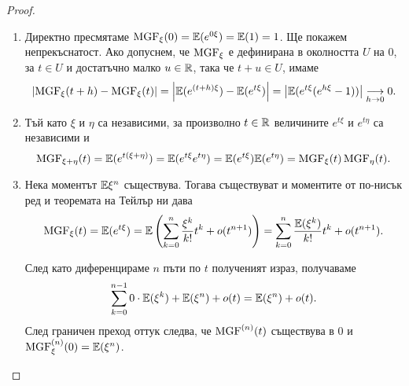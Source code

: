 \documentclass[numbers=endperiod, DIV=15, bibliography=totocnumbered]{scrartcl}
\begin{document}
\begin{proof}
  \mbox{}
  \begin{enumerate}
    \item Директно пресмятаме $\operatorname{MGF}_\xi(0) = \mathbb{E}(e^{0\xi}) = \mathbb{E}(1) = 1$. Ще покажем непрекъснатост. Ако допуснем, че $\operatorname{MGF}_\xi$ е дефинирана в околността $U$ на $0$, за $t \in U$ и достатъчно малко $u \in \mathbb{R}$, така че $t + u \in U$, имаме
    \begin{displaymath}
      \left\vert \operatorname{MGF}_\xi(t + h) - \operatorname{MGF}_\xi(t) \right\vert
      =
      \left\vert \mathbb{E}(e^{(t + h)\xi}) - \mathbb{E}(e^{t\xi}) \right\vert
      =
      \left\vert \mathbb{E}(e^{t\xi} (e^{h\xi} - 1)) \right\vert
      \underset {h \to 0} \longrightarrow
      0.
    \end{displaymath}

    \item Тъй като $\xi$ и $\eta$ са независими, за произволно $t \in \mathbb{R}$ величините $e^{t\xi}$ и $e^{t\eta}$ са независими и
    \begin{displaymath}
      \operatorname{MGF}_{\xi + \eta}(t)
      =
      \mathbb{E}(e^{t(\xi + \eta)})
      =
      \mathbb{E}(e^{t\xi} e^{t\eta})
      =
      \mathbb{E}(e^{t\xi}) \mathbb{E}(e^{t\eta})
      =
      \operatorname{MGF}_\xi(t) \operatorname{MGF}_\eta(t).
    \end{displaymath}

    \item Нека моментът $\mathbb{E} \xi^n$ съществува. Тогава съществуват и моментите от по-нисък ред и теоремата на Тейлър ни дава
    \begin{displaymath}
      \operatorname{MGF}_\xi(t)
      =
      \mathbb{E}(e^{t\xi})
      =
      \mathbb{E} \left( \sum_{k=0}^n \frac {\xi^k} {k!} t^k + o(t^{n+1}) \right)
      =
      \sum_{k=0}^n \frac {\mathbb{E}(\xi^k)} {k!} t^k + o(t^{n+1}).
    \end{displaymath}

    След като диференцираме $n$ пъти по $t$ полученият израз, получаваме
    \begin{displaymath}
      \sum_{k=0}^{n-1} 0 \cdot \mathbb{E}(\xi^k) + \mathbb{E}(\xi^n) + o(t)
      =
      \mathbb{E}(\xi^n) + o(t).
    \end{displaymath}
    След граничен преход оттук следва, че $\operatorname{MGF}^{(n)}(t)$ съществува в $0$ и $\operatorname{MGF}^{(n)}_\xi(0) = \mathbb{E}(\xi^n)$.


\end{enumerate}
\end{proof}
\end{document}
